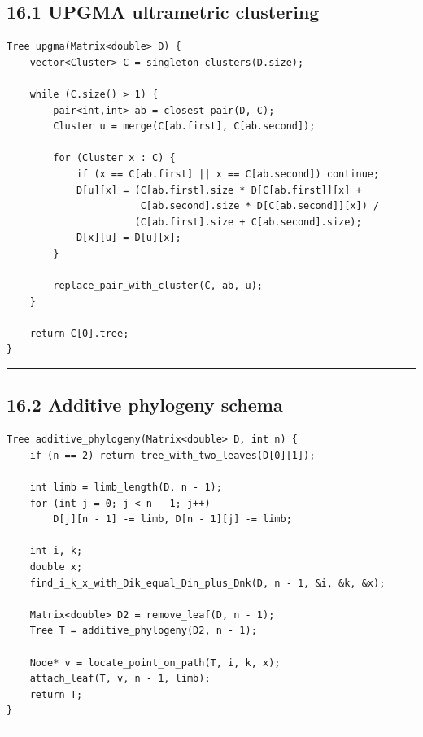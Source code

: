 \documentclass[11pt]{article}
\begin{document}
\subsection{16.1 UPGMA ultrametric clustering}\label{upgma-ultrametric-clustering}

\begin{verbatim}
Tree upgma(Matrix<double> D) {
    vector<Cluster> C = singleton_clusters(D.size);

    while (C.size() > 1) {
        pair<int,int> ab = closest_pair(D, C);
        Cluster u = merge(C[ab.first], C[ab.second]);

        for (Cluster x : C) {
            if (x == C[ab.first] || x == C[ab.second]) continue;
            D[u][x] = (C[ab.first].size * D[C[ab.first]][x] +
                       C[ab.second].size * D[C[ab.second]][x]) /
                      (C[ab.first].size + C[ab.second].size);
            D[x][u] = D[u][x];
        }

        replace_pair_with_cluster(C, ab, u);
    }

    return C[0].tree;
}
\end{verbatim}

\begin{center}\rule{0.5\linewidth}{0.5pt}\end{center}

\subsection{16.2 Additive phylogeny schema}\label{additive-phylogeny-schema}

\begin{verbatim}
Tree additive_phylogeny(Matrix<double> D, int n) {
    if (n == 2) return tree_with_two_leaves(D[0][1]);

    int limb = limb_length(D, n - 1);
    for (int j = 0; j < n - 1; j++)
        D[j][n - 1] -= limb, D[n - 1][j] -= limb;

    int i, k;
    double x;
    find_i_k_x_with_Dik_equal_Din_plus_Dnk(D, n - 1, &i, &k, &x);

    Matrix<double> D2 = remove_leaf(D, n - 1);
    Tree T = additive_phylogeny(D2, n - 1);

    Node* v = locate_point_on_path(T, i, k, x);
    attach_leaf(T, v, n - 1, limb);
    return T;
}
\end{verbatim}

\begin{center}\rule{0.5\linewidth}{0.5pt}\end{center}
\end{document}
